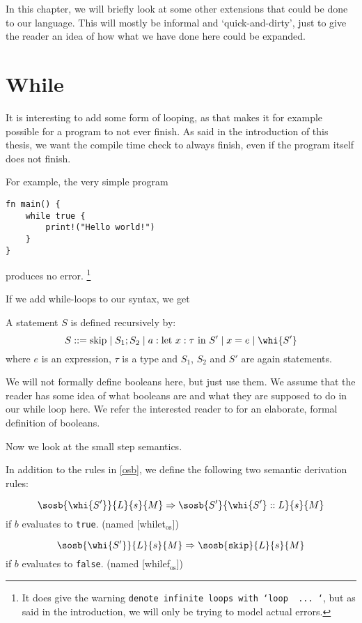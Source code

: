In this chapter, we will briefly look at some other extensions that could be done to our language. This will mostly be informal and `quick-and-dirty', just to give the reader an idea of how what we have done here could be expanded. 

\section{While}
It is interesting to add some form of looping, as that makes it for example possible for a program to not ever finish. As said in the introduction of this thesis, we want the compile time check to always finish, even if the program itself does not finish. 

For example, the very simple program 

\begin{verbatim}
fn main() {
    while true {
        print!("Hello world!")
    }
}
\end{verbatim}

produces no error. \footnote{It does give the warning \texttt{denote infinite loops with `loop { ... }`}, but as said in the introduction, we will only be trying to model actual errors.}

If we add while-loops to our syntax, we get 

\begin{definition}
\label{statementswhile}
A statement $S$ is defined recursively by:
$$S ::= \textrm{skip} \mid S_1; S_2 \mid a: \textrm{let } x:\tau \textrm{ in } S' \mid x = e \mid \whi{S'}$$
where $e$ is an expression, $\tau$ is a type and $S_1$, $S_2$ and $S'$ are again statements.
\end{definition}

We will not formally define booleans here, but just use them. We assume that the reader has some idea of what booleans are and what they are supposed to do in our while loop here. We refer the interested reader to \cite{nielson1992semantics} for an elaborate, formal definition of booleans.

Now we look at the small step semantics.

\begin{definition}
\label{oswhile}
In addition to the rules in \ref{osb}, we define the following two semantic derivation rules:

$$\sosb{\whi{S'}}{L}{s}{M} \Rightarrow \sosb{S'}{\whi{S'}::L}{s}{M}$$ 
if $b$ evaluates to \texttt{true}. (named [whilet$_{\textrm{os}}$])

$$\sosb{\whi{S'}}{L}{s}{M} \Rightarrow \sosb{\texttt{skip}}{L}{s}{M}$$ 
if $b$ evaluates to \texttt{false}. (named [whilef$_{\textrm{os}}$])
\end{definition}

